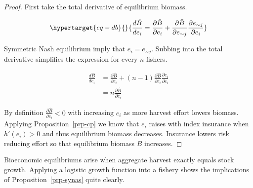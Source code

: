 \documentclass[
  letterpaper,
  DIV=11,
  numbers=noendperiod]{scrartcl}
\theoremstyle{plain}
\theoremstyle{plain}
\theoremstyle{remark}
\begin{document}
\begin{proof}

First take the total derivative of equilibrium biomass.

\begin{equation}\protect\hypertarget{eq-db}{}{
\frac{d \hat{B}}{d e_i}=
\frac{\partial \hat{B}}{\partial e_i}+\frac{\partial \hat{B}}{\partial e_{\sim j}}\frac{\partial e_{\sim j}}{\partial e_i}
}\label{eq-db}\end{equation}

Symmetric Nash equilibrium imply that \(e_i=e_{\sim j}\). Subbing into
the total derivative simplifies the expression for every \(n\) fishers.

\[
\begin{aligned}
\frac{d \hat{B}}{d e_i}&=
\frac{\partial \hat{B}}{\partial e_i}+(n-1)\frac{\partial \hat{B}}{\partial e_i}\frac{\partial e_i}{\partial e_i}\\
&=n\frac{\partial \hat{B}}{\partial e_i}
\end{aligned}
\]

By definition \(\frac{\partial \hat{B}}{\partial e_i}<0\) with
increasing \(e_i\) as more harvest effort lowers biomass. Applying
Proposition~\ref{prp-cp} we know that \(e_i\) raises with index
insurance when \(h'(e_i)>0\) and thus equilibrium biomass decreases.
Insurance lowers risk reducing effort so that equilibrium biomass
\(\hat{B}\) increases.

\end{proof}

Bioeconomic equilibriums arise when aggregate harvest exactly equals
stock growth. Applying a logistic growth function into a fishery shows
the implications of Proposition~\ref{prp-synas} quite clearly.
\end{document}

